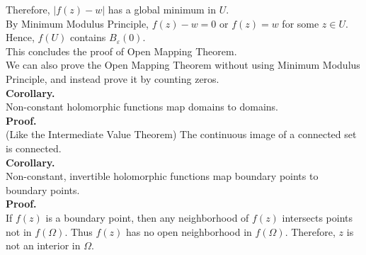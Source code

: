 \documentclass[11pt]{article}
\begin{document}
Therefore, $|f(z) - w|$ has a global minimum in $U$. \\
By Minimum Modulus Principle, $f(z) - w = 0$ or $f(z) = w$ for some $z \in U$. Hence, $f(U)$ contains $B_\varepsilon(0)$. \\
This concludes the proof of Open Mapping Theorem. \\
We can also prove the Open Mapping Theorem without using Minimum Modulus Principle, and instead prove it by counting zeros. \\
\newline
\textbf{Corollary.} \\
Non-constant holomorphic functions map domains to domains. \\
\textbf{Proof.} \\
(Like the Intermediate Value Theorem) The continuous image of a connected set is connected. \\
\newline
\textbf{Corollary.} \\
Non-constant, invertible holomorphic functions map boundary points to boundary points. \\
\textbf{Proof.} \\
If $f(z)$ is a boundary point, then any neighborhood of $f(z)$ intersects points not in $f(\Omega)$. Thus $f(z)$ has no open neighborhood in $f(\Omega)$. Therefore, $z$ is not an interior in $\Omega$. 
\end{document}
